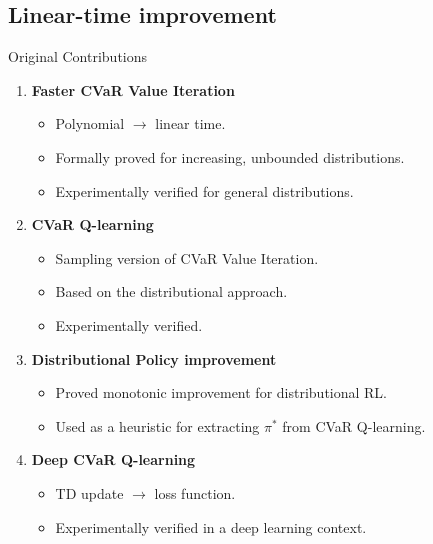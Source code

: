 \documentclass{beamer}
\begin{document}

\subsection{Linear-time improvement}

\begin{frame}{Original Contributions}
\center
\begin{enumerate}
\item \textbf{Faster CVaR Value Iteration} 
\begin{itemize}
\item Polynomial $\to$ linear time.
\item Formally proved for increasing, unbounded distributions.
\item Experimentally verified for general distributions.
\end{itemize}
\item \textbf{CVaR Q-learning} 
\begin{itemize}
\item Sampling version of CVaR Value Iteration.
\item Based on the distributional approach.
\item Experimentally verified.
\end{itemize}
\item \textbf{Distributional Policy improvement}
\begin{itemize}
\item Proved monotonic improvement for distributional RL.
\item Used as a heuristic for extracting $\pi^*$ from CVaR Q-learning.
\end{itemize}
\item \textbf{Deep CVaR Q-learning}
\begin{itemize}
\item TD update $\to$ loss function.
\item Experimentally verified in a deep learning context.
\end{itemize}
\end{enumerate}
\end{frame}

\end{document}
